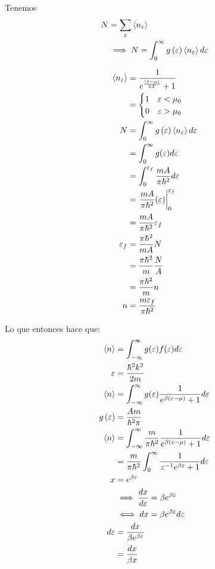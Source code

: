 \documentclass{report}
\begin{document}
Tenemos
\begin{align*}
  N &= \sum_{\varepsilon}\left<n_\varepsilon\right>\\
  &\implies N = \int_0^\infty g\left(\varepsilon\right) \left<n_\varepsilon\right> d\varepsilon\\
\end{align*}

\begin{align*}
  \left<n_\varepsilon\right> &= \frac{1}{e^{\frac{\left(\varepsilon - \mu\right)}{kT}} + 1}\\
  &= \begin{cases}
    1 & \varepsilon < \mu_0\\
    0 & \varepsilon > \mu_0
  \end{cases}\\
  N &= \int_0^\infty g\left(\varepsilon\right) \left<n_\varepsilon\right>d\varepsilon\\
  &= \int_0^\infty g(\varepsilon) d\varepsilon\\
  &= \int_0^{\varepsilon_f}\frac{mA}{\pi\hbar^2} d\varepsilon\\
  &= \left.\frac{m A}{\pi \hbar^2}(\varepsilon)\right|_0^{\varepsilon_f}\\
  &= \frac{m A}{\pi\hbar^2}\varepsilon_f\\
  \varepsilon_f &= \frac{\pi\hbar^2}{mA}N\\
  &= \frac{\pi \hbar^2}{m}\frac{N}{A}\\
  &= \frac{\pi \hbar^2}{m}n \\
  n &= \frac{m\varepsilon_f}{\pi \hbar^2} \\
\end{align*}

Lo que entonces hace que:
\begin{align*}
  \left<n\right> &= \int_{-\infty}^{\infty} g(\varepsilon)f(\varepsilon) d\varepsilon\\
  \varepsilon &= \frac{\hbar^2 k^2}{2 m}\\
  \left<n\right> &= \int_{-\infty}^{\infty} g(\varepsilon)\frac{1}{e^{\beta(\varepsilon - \mu)} + 1}d\varepsilon\\
  g\left(\varepsilon\right) &= \frac{A m}{\hbar^2 \pi} \\
  \left<n\right> &= \int_{-\infty}^{\infty} \frac{m}{\pi\hbar^2}\frac{1}{e^{\beta(\varepsilon - \mu)} + 1}d\varepsilon\\
  &= \frac{m}{\pi \hbar^2} \int_0^\infty \frac{1}{z^{-1}e^{\beta\varepsilon} + 1}d\varepsilon\\
  x &= e^{\beta\varepsilon}\\
  &\implies \frac{dx}{d\varepsilon} = \beta e^{\beta \varepsilon}\\
  &\iff dx = \beta e^{\beta \varepsilon}d\varepsilon\\
  d\varepsilon &= \frac{dx}{\beta e^{\beta \varepsilon}}\\
  &= \frac{dx}{\beta x}
\end{align*}
\end{document}
